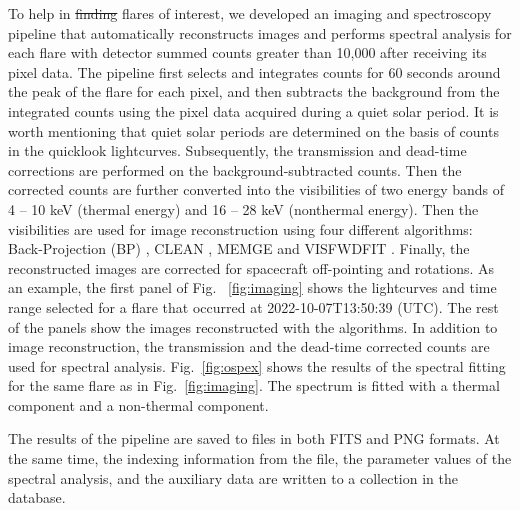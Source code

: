 \documentclass[referee]{aa} %
\providecommand{\DIFaddtex}[1]{{\protect\color{blue}\uwave{#1}}} %
\providecommand{\DIFdeltex}[1]{{\protect\color{red}\sout{#1}}}                      %
\providecommand{\DIFaddbegin}{} %
\providecommand{\DIFaddend}{} %
\providecommand{\DIFdelbegin}{} %
\providecommand{\DIFdelend}{} %
\providecommand{\DIFadd}[1]{\texorpdfstring{\DIFaddtex{#1}}{#1}} %
\providecommand{\DIFdel}[1]{\texorpdfstring{\DIFdeltex{#1}}{}} %
\newcommand{\DIFscaledelfig}{0.5}
\newlength{\DIFdelgraphicswidth} %
\newlength{\DIFdelgraphicsheight} %
\newcommand{\DIFaddincludegraphics}[2][]{{\color{blue}\fbox{\DIFOincludegraphics[#1]{#2}}}} %
\newcommand{\DIFdelincludegraphics}[2][]{%
\sbox{\DIFdelgraphicsbox}{\DIFOincludegraphics[#1]{#2}}%
\settoboxwidth{\DIFdelgraphicswidth}{\DIFdelgraphicsbox} %
\settoboxtotalheight{\DIFdelgraphicsheight}{\DIFdelgraphicsbox} %
\scalebox{\DIFscaledelfig}{%
\parbox[b]{\DIFdelgraphicswidth}{\usebox{\DIFdelgraphicsbox}\\[-\baselineskip] \rule{\DIFdelgraphicswidth}{0em}}\llap{\resizebox{\DIFdelgraphicswidth}{\DIFdelgraphicsheight}{%
\setlength{\unitlength}{\DIFdelgraphicswidth}%
\begin{picture}(1,1)%
\thicklines\linethickness{2pt} %
{\color[rgb]{1,0,0}\put(0,0){\framebox(1,1){}}}%
{\color[rgb]{1,0,0}\put(0,0){\line( 1,1){1}}}%
{\color[rgb]{1,0,0}\put(0,1){\line(1,-1){1}}}%
\end{picture}%
}\hspace*{3pt}}} %
} %
\DeclareRobustCommand{\DIFaddbegin}{\DIFOaddbegin \let\includegraphics\DIFaddincludegraphics} %
\DeclareRobustCommand{\DIFaddend}{\DIFOaddend \let\includegraphics\DIFOincludegraphics} %
\DeclareRobustCommand{\DIFdelbegin}{\DIFOdelbegin \let\includegraphics\DIFdelincludegraphics} %
\DeclareRobustCommand{\DIFdelend}{\DIFOaddend \let\includegraphics\DIFOincludegraphics} %
\begin{document}
To help in \DIFdelbegin \DIFdel{finding }\DIFdelend \DIFaddbegin \DIFadd{identifying }\DIFaddend flares of interest, we developed an imaging and spectroscopy pipeline that automatically reconstructs images and performs spectral analysis for each flare with detector summed counts greater than 10,000
after receiving its pixel data. 
The pipeline first selects and integrates counts for 60 seconds around the peak of the flare for each pixel, and then subtracts the background from the integrated counts using the pixel data acquired during a quiet solar period. It is worth mentioning that quiet solar periods are determined on the basis of counts in the quicklook lightcurves. 
Subsequently, the transmission and dead-time corrections are performed on the background-subtracted counts. Then the corrected counts are further converted into the visibilities of two energy bands of 4 -- 10 keV (thermal energy) and 16 -- 28 keV (nonthermal energy). 
Then the visibilities are used for image reconstruction using four different algorithms: Back-Projection (BP) \citep{paolo2022}, CLEAN \citep{clean}, MEM\textunderscore GE \citep{mem, memge} and VIS\textunderscore FWDFIT \citep{visfwd}. Finally, the reconstructed images are corrected for spacecraft off-pointing and rotations. 
As an example,  the first panel of Fig. ~\ref{fig:imaging} shows the lightcurves and time range selected for a flare that occurred at 2022-10-07T13:50:39 (UTC). 
The rest of the panels show the images reconstructed with the algorithms. 
In addition to image reconstruction, the transmission and the dead-time corrected counts are used for spectral analysis. Fig.~\ref{fig:ospex} shows the results of the spectral fitting for the same flare as in Fig.~\ref{fig:imaging}. The spectrum is fitted with a thermal component and a non-thermal component. 

The results of the pipeline are saved to files in both FITS and PNG formats. At the same time, the indexing information from the file, the parameter values of the spectral analysis, and the auxiliary data are written to a collection in the database. 
\end{document}
